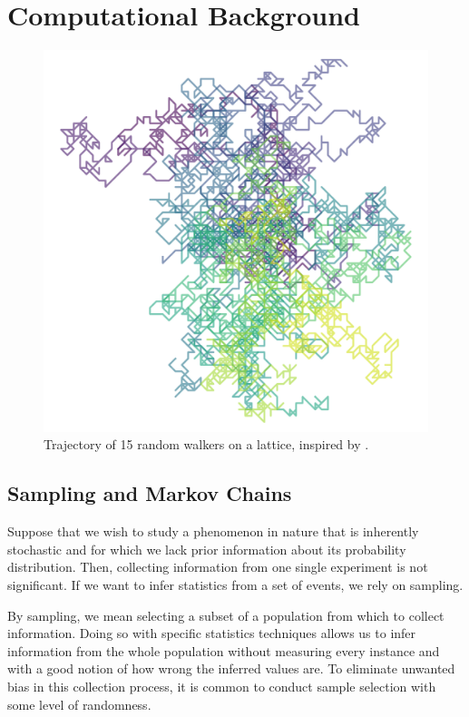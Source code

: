 \chapter{Computational Background}\label{ch:computational}

\begin{figure}[h]
    \centering
    \includegraphics[width=0.8\linewidth]{Chapters/Theoretical_Background/images/random_walkers.pdf}
    \caption{Trajectory of 15 random walkers on a lattice, inspired by \cite{Nordhagen2019}.}
    \label{fig:walkers}
\end{figure}


\section{Sampling and Markov Chains}\label{sec:markov_chains}

Suppose that we wish to study a phenomenon in nature that is inherently stochastic and for which we lack prior information about its probability distribution. Then, collecting information from one single experiment is not significant. If we want to infer statistics from a set of events, we rely on sampling.

By sampling, we mean selecting a subset of a population from which to collect information. Doing so with specific statistics techniques allows us to infer information from the whole population without measuring every instance and with a good notion of how wrong the inferred values are. To eliminate unwanted bias in this collection process, it is common to conduct sample selection with some level of randomness.

